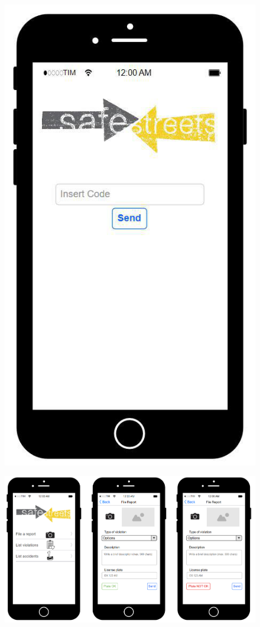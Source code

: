 \begin{figure}
\includegraphics[scale=0.5]{Images/Templates/User/us_2.png}
\end{figure}

\begin{figure}
[H]
\includegraphics[scale=0.47]{Images/Templates/User/us_3.PNG}
\end{figure}

